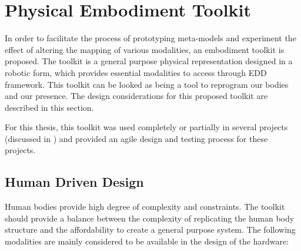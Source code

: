 \pagebreak

\section{Physical Embodiment Toolkit}
\label{concept:toolkit}

In order to facilitate the process of prototyping meta-models and experiment the effect of altering the mapping of various modalities, an embodiment toolkit is proposed. The toolkit is a general purpose physical representation designed in a robotic form, which provides essential modalities to access through EDD framework. This toolkit can be looked as being a tool to reprogram our bodies and our presence. The design considerations for this proposed toolkit are described in this section. 

For this thesis, this toolkit was used completely or partially in several projects (discussed in ) and provided an agile design and testing process for these projects.

\subsection{Human Driven Design}

Human bodies provide high degree of complexity and constraints. The toolkit should provide a balance between the complexity of replicating the human body structure and the affordability to create a general purpose system. The following modalities are mainly considered to be available in the design of the hardware:

